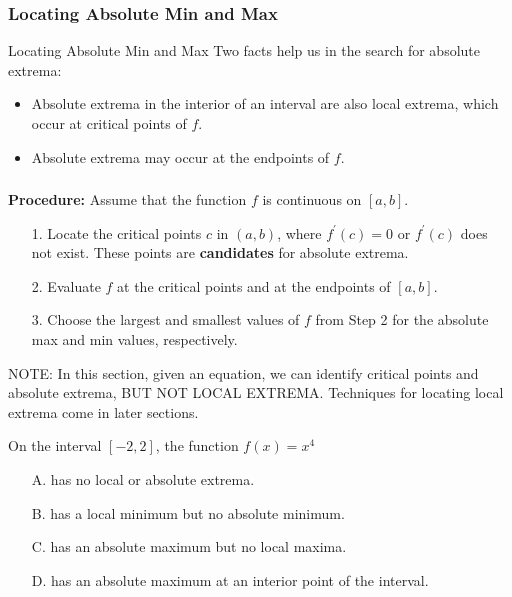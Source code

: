 \documentclass[cal1spr16Lectures.tex]{subfiles}
\begin{document}
\subsubsection{Locating Absolute Min and Max}

\begin{frame}{\small Locating Absolute Min and Max}
Two facts help us in the search for absolute extrema:

\begin{itemize}
\item Absolute extrema in the interior of an interval are also local extrema, which occur at critical points of $f$.
\item Absolute extrema may occur at the endpoints of $f$.
\end{itemize}
\end{frame}

\begin{frame}
\frametitle{}
\footnotesize
{\bf Procedure: } Assume that the function $f$ is continuous on $[a,b]$.

\begin{itemize}
\item[1.] Locate the critical points $c$ in $(a,b)$, where $f^{\prime}(c)=0$ or $f^{\prime}(c)$ does not exist.  These points are {\bf candidates} for absolute extrema.
\item[2.] Evaluate $f$ at the critical points and at the endpoints of $[a,b]$.
\item[3.] Choose the largest and smallest values of $f$ from Step 2 for the absolute max and min values, respectively.
\end{itemize}

NOTE:  In this section, given an equation, we can identify critical points and absolute extrema, \alert{BUT NOT LOCAL EXTREMA}.  Techniques for locating local extrema come in later sections.
\end{frame}

\begin{frame}
\begin{ex}
On the interval $[-2,2]$, the function $f(x)=x^4$
\begin{itemize}
\item[A. ] has no local or absolute extrema.
\item[B. ] has a local minimum but no absolute minimum.
\item[C. ] has an absolute maximum but no local maxima.
\item[D. ] has an absolute maximum at an interior point of the interval.
\end{itemize}
\end{ex}
\end{frame}
\end{document}
